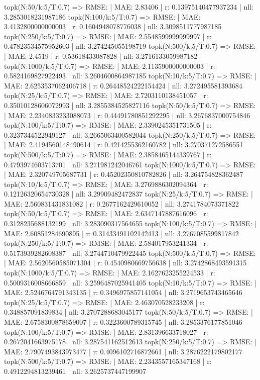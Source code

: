 topk(N:50/k:5/T:0.7) => RMSE: | MAE: 2.83406 | r: 0.13975140477937234 | nll: 3.2853018231987186
topk(N:100/k:5/T:0.7) => RMSE: | MAE: 3.4132800000000003 | r: 0.1604948078776038 | nll: 3.3098511777987185
topk(N:250/k:5/T:0.7) => RMSE: | MAE: 2.5548599999999997 | r: 0.47823534575952603 | nll: 3.274245055198719
topk(N:500/k:5/T:0.7) => RMSE: | MAE: 2.4519 | r: 0.53618433087828 | nll: 3.2716133059987182
topk(N:1000/k:5/T:0.7) => RMSE: | MAE: 2.1135900000000003 | r: 0.5824169827922493 | nll: 3.2604600864987185
topk(N:10/k:5/T:0.7) => RMSE: | MAE: 2.6253537062406718 | r: 0.26448524222154424 | nll: 3.272495581393684
topk(N:25/k:5/T:0.7) => RMSE: | MAE: 2.7203110138451057 | r: 0.35010128606072993 | nll: 3.2855384525827116
topk(N:50/k:5/T:0.7) => RMSE: | MAE: 2.2340833233088073 | r: 0.44491780851292295 | nll: 3.2676837000754846
topk(N:100/k:5/T:0.7) => RMSE: | MAE: 2.3390245351731505 | r: 0.3237344522949127 | nll: 3.2665063400582044
topk(N:250/k:5/T:0.7) => RMSE: | MAE: 2.4194560148490614 | r: 0.4214255362160782 | nll: 3.270371272586551
topk(N:500/k:5/T:0.7) => RMSE: | MAE: 2.3858465144339767 | r: 0.4793974603713701 | nll: 3.271981242046761
topk(N:1000/k:5/T:0.7) => RMSE: | MAE: 2.320749705687731 | r: 0.45202350810782826 | nll: 3.264754828362487
topk(N:10/k:5/T:0.7) => RMSE: | MAE: 3.2769886302094364 | r: 0.12126320654730328 | nll: 3.29909482472837
topk(N:25/k:5/T:0.7) => RMSE: | MAE: 2.560831431831082 | r: 0.2677162429610052 | nll: 3.2741784073371822
topk(N:50/k:5/T:0.7) => RMSE: | MAE: 2.6347147887616096 | r: 0.3128235688132199 | nll: 3.283090317564655
topk(N:100/k:5/T:0.7) => RMSE: | MAE: 2.60851284690895 | r: 0.31433491102142413 | nll: 3.2767085599817842
topk(N:250/k:5/T:0.7) => RMSE: | MAE: 2.584017953241334 | r: 0.5173939282608387 | nll: 3.2744710479922445
topk(N:500/k:5/T:0.7) => RMSE: | MAE: 2.5620560585071304 | r: 0.4540980669756638 | nll: 3.2742868493591315
topk(N:1000/k:5/T:0.7) => RMSE: | MAE: 2.1627623255224533 | r: 0.5009316008666859 | nll: 3.2596487025941405
topk(N:10/k:5/T:0.7) => RMSE: | MAE: 2.5246764791343135 | r: 0.3496975857141054 | nll: 3.2719653743465646
topk(N:25/k:5/T:0.7) => RMSE: | MAE: 2.463070528233208 | r: 0.348857091839834 | nll: 3.2707288683045177
topk(N:50/k:5/T:0.7) => RMSE: | MAE: 2.6758300878659007 | r: 0.3223600789315745 | nll: 3.2853376177851046
topk(N:100/k:5/T:0.7) => RMSE: | MAE: 2.831396633718027 | r: 0.2672041663975178 | nll: 3.287541162512613
topk(N:250/k:5/T:0.7) => RMSE: | MAE: 2.7907493843973477 | r: 0.4096102716872661 | nll: 3.2876222179802177
topk(N:500/k:5/T:0.7) => RMSE: | MAE: 2.2343557165347168 | r: 0.4912294813239461 | nll: 3.2625737447199907
